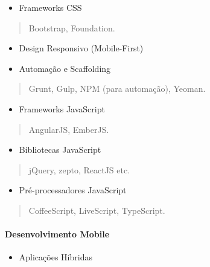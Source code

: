 \documentclass[]{article}
\providecommand{\tightlist}{%
  \setlength{\itemsep}{0pt}\setlength{\parskip}{0pt}}
\let\oldparagraph\paragraph
\renewcommand{\paragraph}[1]{\oldparagraph{#1}\mbox{}}
\begin{document}
\begin{itemize}
\tightlist
\item
  Frameworks CSS
\end{itemize}

\begin{quote}
Bootstrap, Foundation.
\end{quote}

\begin{itemize}
\item
  Design Responsivo (Mobile-First)
\item
  Automação e Scaffolding
\end{itemize}

\begin{quote}
Grunt, Gulp, NPM (para automação), Yeoman.
\end{quote}

\begin{itemize}
\tightlist
\item
  Frameworks JavaScript
\end{itemize}

\begin{quote}
AngularJS, EmberJS.
\end{quote}

\begin{itemize}
\tightlist
\item
  Bibliotecas JavaScript
\end{itemize}

\begin{quote}
jQuery, zepto, ReactJS etc.
\end{quote}

\begin{itemize}
\tightlist
\item
  Pré-processadores JavaScript
\end{itemize}

\begin{quote}
CoffeeScript, LiveScript, TypeScript.
\end{quote}

\paragraph{Desenvolvimento Mobile}\label{desenvolvimento-mobile}

\begin{itemize}
\tightlist
\item
  Aplicações Híbridas
\end{itemize}
\end{document}
